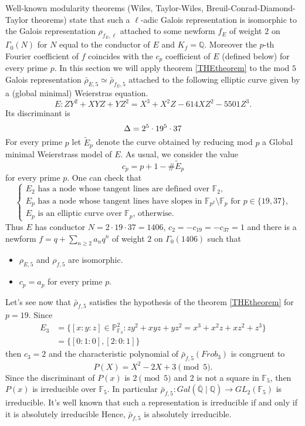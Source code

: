 \documentclass[12pt,reqno]{amsart}
\theoremstyle{plain}
\theoremstyle{definition}
\begin{document}
Well-known modularity
 theorems (Wiles, Taylor-Wiles, Breuil-Conrad-Diamond-Taylor theorems) state that such a $\ell$-adic Galois representation is isomorphic to the Galois representation $\rho_{f_E,\ell}$ attached
 to some newform $f_E$ of weight $2$ on $\Gamma_0(N)$ for $N$ equal to the conductor of $E$ and $K_f=\mathbb Q$.
 Moreover the $p$-th Fourier coefficient of 
 $f$ coincides with the $c_p$ coefficient of $E$ (defined below) for every prime $p$. In this section we will apply theorem \ref{THEtheorem} to the mod $5$ Galois representation $\bar\rho_{E,5}\simeq \bar\rho_{f_E,5}$ attached to  the following elliptic curve given by a (global minimal) Weierstras equation.
$$
E:ZY^2 +XYZ + YZ^2 = X^3 + X^2Z -614X Z^2-5501Z^3.
$$
Its discriminant is
$$
\Delta = 2^5\cdot19^5\cdot 37\\
$$
For every prime $p$ let $\tilde E_p$ denote the curve obtained by reducing mod $p$ a Global minimal Weierstrass model of $E$. As usual, we consider the value
$$
c_p=p+1 -\#\tilde E_p
$$
for every prime $p$.
One can check that 
$$
\begin{cases}
\text{$E_2$ has a node whose tangent lines are defined over $\mathbb F_2$,}\\
\text{$E_p$ has a node whose tangent lines have slopes in $\mathbb F_{p^2}\setminus \mathbb F_p$  for $p\in \{19,37\}$,}\\
\text{$E_p$ is an elliptic curve over $\mathbb F_p$, otherwise.}
\end{cases}
$$
Thus $E$ has conductor $N= 2\cdot 19\cdot 37=1406$, $c_2 = -c_{19}=-c_{37}=1$ and there is a newform $f=q+\sum_{n\geq 2} a_n q^n$ of weight $2$ on $\Gamma_0(1406)$ such that 
\begin{itemize}
\item $\rho_{E,5}$ and $\rho_{f,5}$ are isomorphic.
\item
$c_p = a_p$ for every prime $p$.
\end{itemize}
Let's see now that $\bar\rho_{f,5}$ satisfies the hypothesis of the theorem \ref{THEtheorem} for $p=19$. Since
\begin{align*}
E_3&=\{[x:y:z]\in \mathbb P^2_{\mathbb F_3}: zy^2 + xyz+ yz^2 = x^3+x^2z+xz^2+z^3\}\\
	&=\{[0:1:0], [2:0:1]\}
\end{align*}
then $c_3= 2$ and the characteristic polynomial of $\bar\rho_{f,5}(Frob_3)$ is congruent to
$$
P(X) = X^2- 2X + 3   \pmod 5.
$$
Since the discriminant of $P(x)$ is $2\pmod 5$ and $2$ is not a square in $\mathbb F_5$, then $P(x)$ is irreducible over $\mathbb F_5$. In particular $\bar\rho_{f,5}:Gal(\overline{\mathbb Q}\mid\mathbb Q)\longrightarrow GL_2(\mathbb F_5)$ is irreducible. It's well known that such a representation is irreducible if and only if it is absolutely irreducible
Hence, $\bar\rho_{f,5}$ is absolutely irreducible. 
\end{document}
